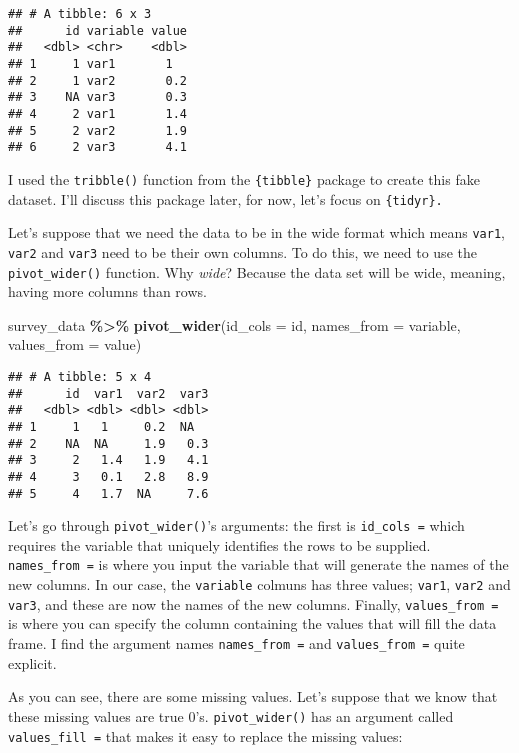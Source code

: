 \documentclass[
]{article}
\newenvironment{Shaded}{\begin{snugshade}}{\end{snugshade}}
\newcommand{\DataTypeTok}[1]{\textcolor[rgb]{0.13,0.29,0.53}{#1}}
\newcommand{\KeywordTok}[1]{\textcolor[rgb]{0.13,0.29,0.53}{\textbf{#1}}}
\newcommand{\NormalTok}[1]{#1}
\newcommand{\OperatorTok}[1]{\textcolor[rgb]{0.81,0.36,0.00}{\textbf{#1}}}
\newcommand{\StringTok}[1]{\textcolor[rgb]{0.31,0.60,0.02}{#1}}
\begin{document}
\begin{verbatim}
## # A tibble: 6 x 3
##      id variable value
##   <dbl> <chr>    <dbl>
## 1     1 var1       1  
## 2     1 var2       0.2
## 3    NA var3       0.3
## 4     2 var1       1.4
## 5     2 var2       1.9
## 6     2 var3       4.1
\end{verbatim}

I used the \texttt{tribble()} function from the \texttt{\{tibble\}} package to create this fake dataset.
I'll discuss this package later, for now, let's focus on \texttt{\{tidyr\}.}

Let's suppose that we need the data to be in the wide format which means \texttt{var1}, \texttt{var2} and \texttt{var3}
need to be their own columns. To do this, we need to use the \texttt{pivot\_wider()} function. Why \emph{wide}?
Because the data set will be wide, meaning, having more columns than rows.

\begin{Shaded}
\begin{Highlighting}[]
\NormalTok{survey\_data }\OperatorTok{\%\textgreater{}\%}\StringTok{ }
\StringTok{  }\KeywordTok{pivot\_wider}\NormalTok{(}\DataTypeTok{id\_cols =}\NormalTok{ id, }\DataTypeTok{names\_from =}\NormalTok{ variable, }\DataTypeTok{values\_from =}\NormalTok{ value)}
\end{Highlighting}
\end{Shaded}

\begin{verbatim}
## # A tibble: 5 x 4
##      id  var1  var2  var3
##   <dbl> <dbl> <dbl> <dbl>
## 1     1   1     0.2  NA  
## 2    NA  NA     1.9   0.3
## 3     2   1.4   1.9   4.1
## 4     3   0.1   2.8   8.9
## 5     4   1.7  NA     7.6
\end{verbatim}

Let's go through \texttt{pivot\_wider()}'s arguments: the first is \texttt{id\_cols\ =} which requires the variable
that uniquely identifies the rows to be supplied. \texttt{names\_from\ =} is where you input the variable that will
generate the names of the new columns. In our case, the \texttt{variable} colmuns has three values; \texttt{var1},
\texttt{var2} and \texttt{var3}, and these are now the names of the new columns. Finally, \texttt{values\_from\ =} is where
you can specify the column containing the values that will fill the data frame.
I find the argument names \texttt{names\_from\ =} and \texttt{values\_from\ =} quite explicit.

As you can see, there are some missing values. Let's suppose that we know that these missing values
are true 0's. \texttt{pivot\_wider()} has an argument called \texttt{values\_fill\ =} that makes it easy to replace
the missing values:
\end{document}
